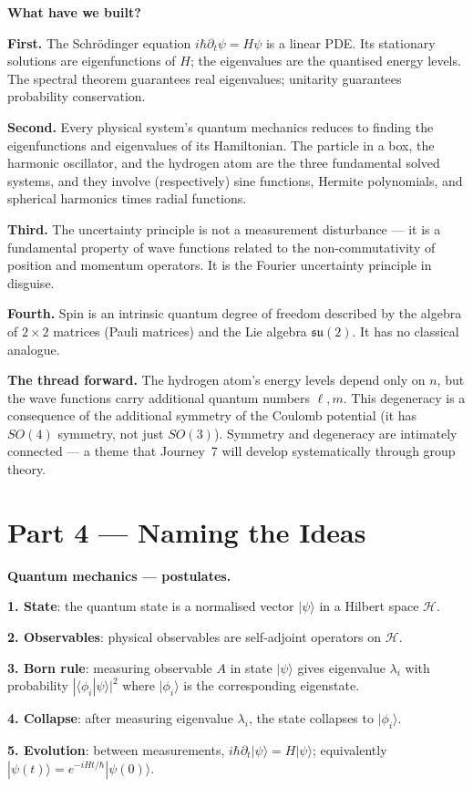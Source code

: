 \documentclass[12pt,a4paper]{article}
\begin{document}
\begin{discoverybox}
\textbf{What have we built?}

\textbf{First.} The Schr\"{o}dinger equation $i\hbar\partial_t\psi = H\psi$ is a linear PDE. Its stationary solutions are eigenfunctions of $H$; the eigenvalues are the quantised energy levels. The spectral theorem guarantees real eigenvalues; unitarity guarantees probability conservation.

\textbf{Second.} Every physical system's quantum mechanics reduces to finding the eigenfunctions and eigenvalues of its Hamiltonian. The particle in a box, the harmonic oscillator, and the hydrogen atom are the three fundamental solved systems, and they involve (respectively) sine functions, Hermite polynomials, and spherical harmonics times radial functions.

\textbf{Third.} The uncertainty principle is not a measurement disturbance --- it is a fundamental property of wave functions related to the non-commutativity of position and momentum operators. It is the Fourier uncertainty principle in disguise.

\textbf{Fourth.} Spin is an intrinsic quantum degree of freedom described by the algebra of $2\times 2$ matrices (Pauli matrices) and the Lie algebra $\mathfrak{su}(2)$. It has no classical analogue.

\medskip
\textbf{The thread forward.} The hydrogen atom's energy levels depend only on $n$, but the wave functions carry additional quantum numbers $\ell,m$. This degeneracy is a consequence of the additional symmetry of the Coulomb potential (it has $SO(4)$ symmetry, not just $SO(3)$). Symmetry and degeneracy are intimately connected --- a theme that Journey~7 will develop systematically through group theory.
\end{discoverybox}

\section{Part 4 \texorpdfstring{---}{--} Naming the Ideas}

\begin{namebox}
\textbf{Quantum mechanics --- postulates.}

\textbf{1. State}: the quantum state is a normalised vector $|\psi\rangle$ in a Hilbert space $\mathcal{H}$.

\textbf{2. Observables}: physical observables are self-adjoint operators on $\mathcal{H}$.

\textbf{3. Born rule}: measuring observable $A$ in state $|\psi\rangle$ gives eigenvalue $\lambda_i$ with probability $|\langle\phi_i|\psi\rangle|^2$ where $|\phi_i\rangle$ is the corresponding eigenstate.

\textbf{4. Collapse}: after measuring eigenvalue $\lambda_i$, the state collapses to $|\phi_i\rangle$.

\textbf{5. Evolution}: between measurements, $i\hbar\partial_t|\psi\rangle = H|\psi\rangle$; equivalently $|\psi(t)\rangle = e^{-iHt/\hbar}|\psi(0)\rangle$.
\end{namebox}
\end{document}
